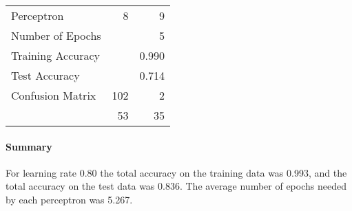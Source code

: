 \documentclass[11pt]{article}
\begin{document}
\begin{minipage}[t]{0.5\textwidth}
\begin{tabular}{|l | r r|}
\hline Perceptron & 8 & 9\\
Number of Epochs & & 5\\
Training Accuracy & & 0.990\\
Test Accuracy & & 0.714\\
Confusion Matrix & 102 & 2\\
 &53 & 35\\ \hline
\end{tabular}
\end{minipage}
\paragraph{Summary} For learning rate 0.80 the total accuracy on the training data was 0.993, and the total accuracy on the test data was 0.836.  The average number of epochs needed by each perceptron was 5.267.
\end{document}

